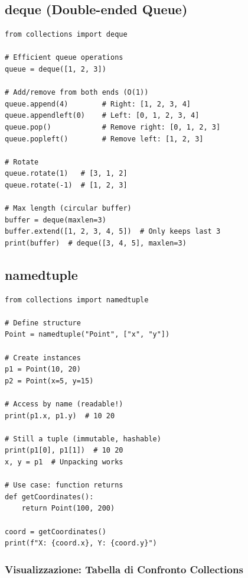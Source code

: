 \subsection{deque (Double-ended Queue)}

\begin{lstlisting}
from collections import deque

# Efficient queue operations
queue = deque([1, 2, 3])

# Add/remove from both ends (O(1))
queue.append(4)        # Right: [1, 2, 3, 4]
queue.appendleft(0)    # Left: [0, 1, 2, 3, 4]
queue.pop()            # Remove right: [0, 1, 2, 3]
queue.popleft()        # Remove left: [1, 2, 3]

# Rotate
queue.rotate(1)   # [3, 1, 2]
queue.rotate(-1)  # [1, 2, 3]

# Max length (circular buffer)
buffer = deque(maxlen=3)
buffer.extend([1, 2, 3, 4, 5])  # Only keeps last 3
print(buffer)  # deque([3, 4, 5], maxlen=3)
\end{lstlisting}

\subsection{namedtuple}

\begin{lstlisting}
from collections import namedtuple

# Define structure
Point = namedtuple("Point", ["x", "y"])

# Create instances
p1 = Point(10, 20)
p2 = Point(x=5, y=15)

# Access by name (readable!)
print(p1.x, p1.y)  # 10 20

# Still a tuple (immutable, hashable)
print(p1[0], p1[1])  # 10 20
x, y = p1  # Unpacking works

# Use case: function returns
def getCoordinates():
    return Point(100, 200)

coord = getCoordinates()
print(f"X: {coord.x}, Y: {coord.y}")
\end{lstlisting}

\subsubsection{Visualizzazione: Tabella di Confronto Collections}

